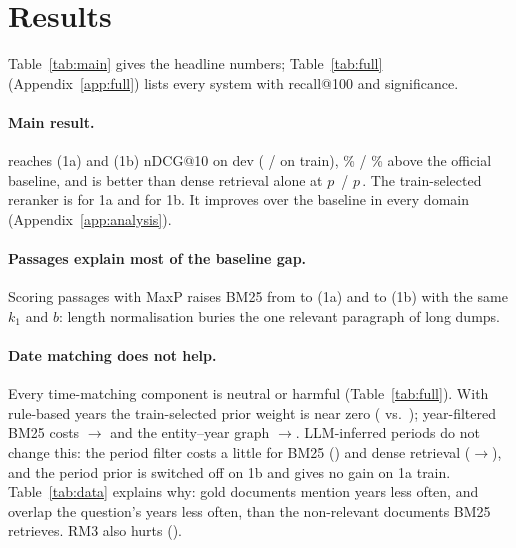 \section{Results}
\label{sec:results}




Table~\ref{tab:main} gives the headline numbers; Table~\ref{tab:full} (Appendix~\ref{app:full})
lists every system with recall@100 and significance.

\paragraph{Main result.} \sys reaches \rFinalA{} (1a) and \rFinalB{} (1b) nDCG@10 on dev
(\rTrainFinalA{} / \rTrainFinalB{} on train), \gainOfficialA\% / \gainOfficialB\% above the
official baseline, and is better than dense retrieval alone at $p\,$\pFinalDenseA{} /
$p\,$\pFinalDenseB{}. The train-selected reranker is \finalRerankA{} for 1a and \finalRerankB{}
for 1b. It improves over the baseline in every domain (Appendix~\ref{app:analysis}).

\paragraph{Passages explain most of the baseline gap.} Scoring passages with MaxP raises BM25
from \rOfficialA{} to \rBmA{} (1a) and \rOfficialB{} to \rBmB{} (1b) with the same $k_1$ and $b$:
length normalisation buries the one relevant paragraph of long dumps.



\paragraph{Date matching does not help.} Every time-matching component is neutral or harmful
(Table~\ref{tab:full}). With rule-based years the train-selected prior weight is near zero
(\rPriorExpA{} vs.\ \rBmA{}); year-filtered BM25 costs \rBmA{}$\rightarrow$\rBmTimeA{} and the
entity--year graph \rBmA{}$\rightarrow$\rBmKgA{}. LLM-inferred periods do not change this: the
period filter costs a little for BM25 (\rMetaTfBmA{}) and dense retrieval (\rDenseA{}$\rightarrow$\rMetaTfDenseA{}),
and the period prior is switched off on 1b and gives no gain on 1a train. Table~\ref{tab:data}
explains why: gold documents mention years less often, and overlap the question's years less
often, than the non-relevant documents BM25 retrieves. RM3 also hurts (\rRmA{}).

